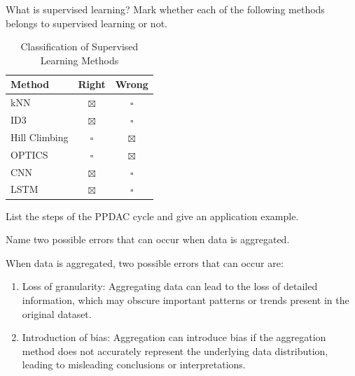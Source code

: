 \documentclass[12pt]{article}
\begin{document}
    \begin{ejercicio}
        What is supervised learning? Mark whether each of the following methods belongs to supervised learning or not.

        \begin{table}[h!]
        \centering
        \begin{tabular}{lcc}
        \hline
        \textbf{Method} & \textbf{Right} & \textbf{Wrong} \\ \hline
        kNN & $\boxtimes$ & $\square$ \\
        ID3 & $\boxtimes$ & $\square$ \\
        Hill Climbing & $\square$ & $\boxtimes$ \\
        OPTICS & $\square$ & $\boxtimes$ \\
        CNN & $\boxtimes$ & $\square$ \\
        LSTM & $\boxtimes$ & $\square$ \\ \hline
        \end{tabular}
        \caption{Classification of Supervised Learning Methods}
        \end{table}
    \end{ejercicio}

    \begin{ejercicio}
        List the steps of the PPDAC cycle and give an application example.
    \end{ejercicio}

    \begin{ejercicio}
        Name two possible errors that can occur when data is aggregated.

        When data is aggregated, two possible errors that can occur are:
        \begin{enumerate}
            \item Loss of granularity: Aggregating data can lead to the loss of detailed information, which may obscure important patterns or trends present in the original dataset.
            \item Introduction of bias: Aggregation can introduce bias if the aggregation method does not accurately represent the underlying data distribution, leading to misleading conclusions or interpretations.
        \end{enumerate}
    \end{ejercicio}
\end{document}
